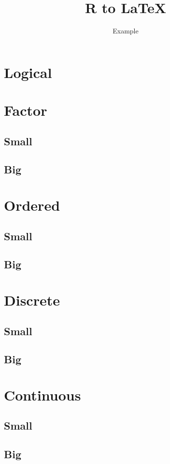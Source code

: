 \documentclass[a4paper, 10pt]{article}
\title{R to LaTeX}
\author{Example}
\date{}
\begin{document}
 
\newpage
\section{Logical}


\newpage
\section{Factor}
\subsection{Small}

\subsection{Big}


\newpage
\section{Ordered}
\subsection{Small}

\subsection{Big}


\newpage
\section{Discrete}
\subsection{Small}

\subsection{Big}


\newpage
\section{Continuous}
\subsection{Small}

\subsection{Big}

 
\end{document}
